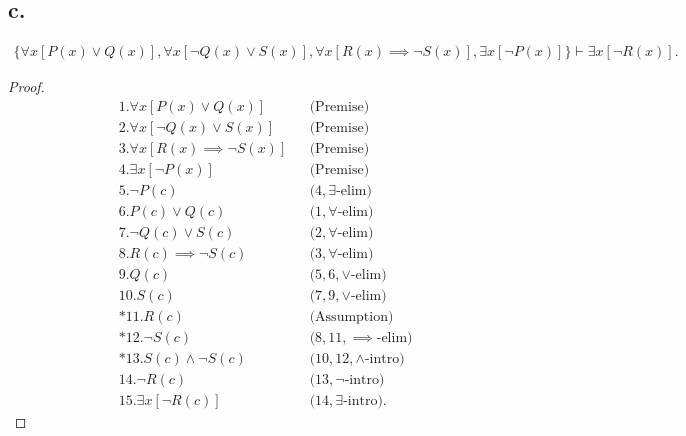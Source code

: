 \documentclass{article}
\begin{document}
\subsection*{c.}
\begin{align*}
  \{ 
  \forall x \left[ P(x) \lor Q(x) \right],
  \forall x \left[ \lnot Q(x) \lor S(x) \right],
  \forall x \left[ R(x) \implies \lnot S(x) \right],
  \exists x \left[ \lnot P(x) \right]
  \}
  \vdash
  \exists x \left[\lnot R(x) \right].
\end{align*}
\begin{proof}
  \begin{align*}
    &1. \forall x \left[ P(x) \lor Q(x) \right] &&\text{(Premise)} \\
    &2. \forall x \left[ \lnot Q(x) \lor S(x) \right] &&\text{(Premise)} \\
    &3. \forall x \left[ R(x) \implies \lnot S(x) \right] &&\text{(Premise)} \\
    &4. \exists x \left[ \lnot P(x) \right] &&\text{(Premise)} \\
    &5. \lnot P(c) &&\text{($4, \exists$-elim)} \\
    &6. P(c) \lor Q(c) &&\text{($1, \forall$-elim)} \\
    &7. \lnot Q(c) \lor S(c) &&\text{($2, \forall$-elim)} \\
    &8. R(c) \implies \lnot S(c) &&\text{($3, \forall$-elim)} \\
    &9. Q(c) &&\text{($5, 6, \lor$-elim)} \\
    &10. S(c) &&\text{($7, 9, \lor$-elim)} \\
    &*11. R(c) &&\text{(Assumption)} \\
    &*12. \lnot S(c) &&\text{($8, 11, \implies$-elim)} \\
    &*13. S(c) \land \lnot S(c) &&\text{($10, 12, \land$-intro)} \\
    &14. \lnot R(c) &&\text{($13, \lnot$-intro)} \\
    &15. \exists x \left[ \lnot R(c) \right]  &&\text{($14, \exists$-intro)}.
  \end{align*}
\end{proof}

\newpage
\end{document}
